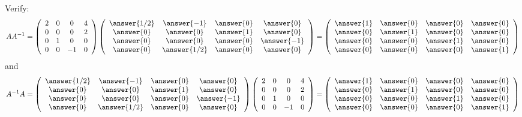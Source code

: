 \documentclass{ximera}
\begin{document}
\begin{exercise}
\begin{exercise}
\begin{prompt}
Verify:
\[ A A^{-1} = \left(\begin{array}{cccc}
2 & 0 & 0 & 4\\
0 & 0 &0& 2\\
0& 1 & 0 & 0\\
0 & 0 & -1 & 0
\end{array}\right)\left(\begin{array}{cccc}
\answer{1/2} & \answer{-1} &\answer{0} & \answer{0}\\
 \answer{0} & \answer{0} &\answer{1} & \answer{0}\\
 \answer{0} & \answer{0} &\answer{0} & \answer{-1}\\
 \answer{0} & \answer{1/2} &\answer{0} & \answer{0}
\end{array}\right)= \left(\begin{array}{cccc}
\answer{1} & \answer{0} &\answer{0} & \answer{0}\\
 \answer{0} & \answer{1} &\answer{0} & \answer{0}\\
 \answer{0} & \answer{0} &\answer{1} & \answer{0}\\
 \answer{0} & \answer{0} &\answer{0} & \answer{1}
\end{array}\right)
\]
and
\[A^{-1}A=
\left(\begin{array}{cccc}
\answer{1/2} & \answer{-1} &\answer{0} & \answer{0}\\
 \answer{0} & \answer{0} &\answer{1} & \answer{0}\\
 \answer{0} & \answer{0} &\answer{0} & \answer{-1}\\
 \answer{0} & \answer{1/2} &\answer{0} & \answer{0}
\end{array}\right)\left(\begin{array}{cccc}
2 & 0 & 0 & 4\\
0 & 0 &0& 2\\
0& 1 & 0 & 0\\
0 & 0 & -1 & 0
\end{array}\right)= \left(\begin{array}{cccc}
\answer{1} & \answer{0} &\answer{0} & \answer{0}\\
 \answer{0} & \answer{1} &\answer{0} & \answer{0}\\
 \answer{0} & \answer{0} &\answer{1} & \answer{0}\\
 \answer{0} & \answer{0} &\answer{0} & \answer{1}
\end{array}\right)
\]

\end{prompt}
\end{exercise}



\end{exercise}
\end{document}
